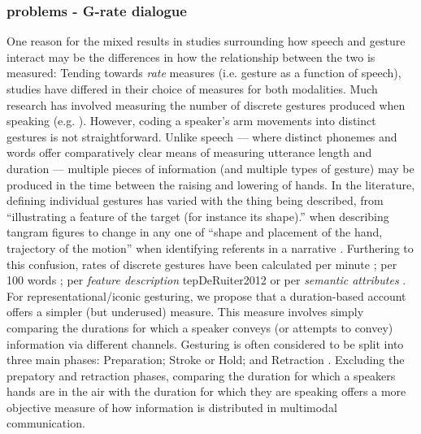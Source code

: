 \documentclass[a4paper,man,natbib]{apa6}
\newcommand*{\term}[1]{\emph{#1}} %
\begin{document}
\subsubsection{problems - G-rate dialogue}
One reason for the mixed results in studies surrounding how speech and gesture interact may be the differences in how the relationship between the two is measured:
Tending towards \term{rate} measures (i.e. gesture as a function of speech), studies have differed in their choice of measures for both modalities.
Much research has involved measuring the number of discrete gestures produced when speaking (e.g. \citet{Hostetter2007, Gerwing2011, DeRuiter2012, Hoetjes2015}).
However, coding a speaker's arm movements into distinct gestures is not straightforward.
Unlike speech --- where distinct phonemes and words offer comparatively clear means of measuring utterance length and duration --- multiple pieces of information (and multiple types of gesture) may be produced in the time between the raising and lowering of hands.
In the literature, defining individual gestures has varied with the thing being described, from ``illustrating a feature of the target (for instance its shape).'' when describing tangram figures \citep{DeRuiter2012} to change in any one of ``shape and placement of the hand, trajectory of the motion'' when identifying referents in a narrative \citep{So2009}.
Furthering to this confusion, rates of discrete gestures have been calculated per minute \citep{Mol2011}; per 100 words \citep{Masson-Carro2015, Hostetter2007, Gerwing2011, Hoetjes2015}; per \term{feature description} 
tep{DeRuiter2012} or per \term{semantic attributes} \citep{Hoetjes2015}.\\




For representational/iconic gesturing, we propose that a duration-based account offers a simpler (but underused) measure.
This measure involves simply comparing the durations for which a speaker conveys (or attempts to convey) information via different channels. 
Gesturing is often considered to be split into three main phases: Preparation; Stroke or Hold; and Retraction \citep{McNeill1992}.
Excluding the prepatory and retraction phases, comparing the duration for which a speakers hands are in the air with the duration for which they are speaking offers a more objective measure of how 
information is distributed in multimodal communication.
\end{document}
